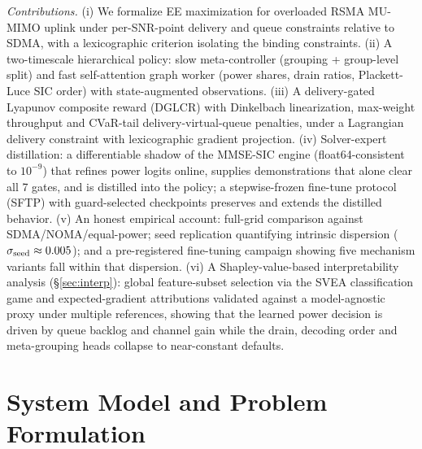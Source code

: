 \documentclass[journal]{IEEEtran}
\begin{document}
\emph{Contributions.} (i) We formalize EE maximization for overloaded RSMA
MU-MIMO uplink under per-SNR-point delivery and queue constraints relative to
SDMA, with a lexicographic criterion isolating the binding constraints.
(ii) A two-timescale hierarchical policy: slow meta-controller (grouping +
group-level split) and fast self-attention graph worker (power shares, drain
ratios, Plackett-Luce SIC order) with state-augmented observations.
(iii) A delivery-gated Lyapunov composite reward (DGLCR) with Dinkelbach
linearization, max-weight throughput and CVaR-tail delivery-virtual-queue
penalties, under a Lagrangian delivery constraint with lexicographic gradient
projection. (iv) Solver-expert distillation: a differentiable shadow of the
MMSE-SIC engine (float64-consistent to $10^{-9}$) that refines power logits
online, supplies demonstrations that alone clear all 7 gates, and is distilled
into the policy; a stepwise-frozen fine-tune protocol (SFTP) with guard-selected
checkpoints preserves and extends the distilled behavior. (v) An honest empirical
account: full-grid comparison against SDMA/NOMA/equal-power; seed replication
quantifying intrinsic dispersion ($\sigma_{\rm seed}\approx 0.005$); and a
pre-registered fine-tuning campaign showing five mechanism variants fall within
that dispersion. (vi) A Shapley-value-based interpretability analysis
(\S\ref{sec:interp}): global feature-subset selection via the SVEA
classification game and expected-gradient attributions validated against a
model-agnostic proxy under multiple references, showing that the learned power
decision is driven by queue backlog and channel gain while the drain, decoding
order and meta-grouping heads collapse to near-constant defaults.

\section{System Model and Problem Formulation}
\label{sec:system}
\end{document}
